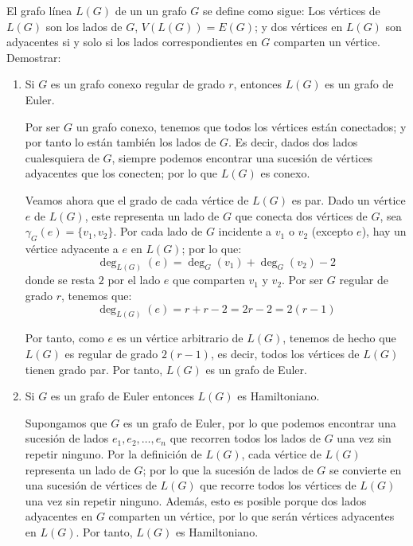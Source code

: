 \begin{ejercicio}\label{ej:1.20}
    El grafo línea $L(G)$ de un un grafo $G$ se define como sigue: Los vértices de $L(G)$ son los lados de $G$, $V(L(G)) = E(G)$; y dos vértices en $L(G)$ son adyacentes si y solo si los lados correspondientes en $G$ comparten un vértice. Demostrar:
    \begin{enumerate}
        \item Si $G$ es un grafo conexo regular de grado $r$, entonces $L(G)$ es un grafo de Euler.
        
        Por ser $G$ un grafo conexo, tenemos que todos los vértices están conectados; y por tanto lo están también los lados de $G$. Es decir, dados dos lados cualesquiera de $G$, siempre podemos encontrar una sucesión de vértices adyacentes que los conecten; por lo que $L(G)$ es conexo.
        
        Veamos ahora que el grado de cada vértice de $L(G)$ es par. Dado un vértice $e$ de $L(G)$, este representa un lado de $G$ que conecta dos vértices de $G$, sea $\gamma_G(e)=\{v_1,v_2\}$. Por cada lado de $G$ incidente a $v_1$ o $v_2$ (excepto $e$), hay un vértice adyacente a $e$ en $L(G)$; por lo que:
        \begin{equation*}
            \deg_{L(G)}(e) = \deg_G(v_1) + \deg_G(v_2)-2
        \end{equation*}
        donde se resta $2$ por el lado $e$ que comparten $v_1$ y $v_2$. Por ser $G$ regular de grado $r$, tenemos que:
        \begin{equation*}
            \deg_{L(G)}(e) = r+r-2 = 2r-2=2(r-1)
        \end{equation*}

        Por tanto, como $e$ es un vértice arbitrario de $L(G)$, tenemos de hecho que $L(G)$ es regular de grado $2(r-1)$, es decir, todos los vértices de $L(G)$ tienen grado par. Por tanto, $L(G)$ es un grafo de Euler.
        
        \item Si $G$ es un grafo de Euler entonces $L(G)$ es Hamiltoniano.
        
        Supongamos que $G$ es un grafo de Euler, por lo que podemos encontrar una sucesión de lados $e_1,e_2,\ldots,e_n$ que recorren todos los lados de $G$ una vez sin repetir ninguno. Por la definición de $L(G)$, cada vértice de $L(G)$ representa un lado de $G$; por lo que la sucesión de lados de $G$ se convierte en una sucesión de vértices de $L(G)$ que recorre todos los vértices de $L(G)$ una vez sin repetir ninguno. Además, esto es posible porque dos lados adyacentes en $G$ comparten un vértice, por lo que serán vértices adyacentes en $L(G)$. Por tanto, $L(G)$ es Hamiltoniano.
    \end{enumerate}
\end{ejercicio}

